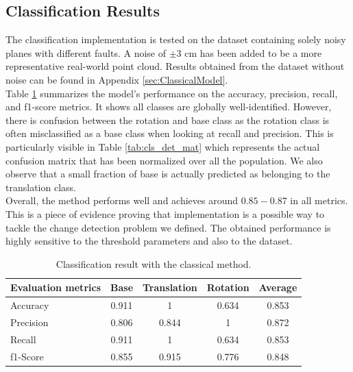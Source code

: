 \subsection{Classification Results}
The classification implementation is tested on the dataset containing solely noisy planes with different faults. A noise of $\pm 3$ cm has been added to be a more representative real-world point cloud. Results obtained from the dataset without noise can be found in Appendix \ref{sec:ClassicalModel}.\\

Table \ref{tab:cls_det_noise} summarizes the model's performance on the accuracy, precision, recall, and f1-score metrics. It shows all classes are globally well-identified. However, there is confusion between the rotation and base class as the rotation class is often misclassified as a base class when looking at recall and precision. This is particularly visible in Table \ref{tab:cls_det_mat} which represents the actual confusion matrix that has been normalized over all the population. We also observe that a small fraction of base is actually predicted as belonging to the translation class.\\

Overall, the method performs well and achieves around $0.85-0.87$ in all metrics. This is a piece of evidence proving that implementation is a possible way to tackle the change detection problem we defined. The obtained performance is highly sensitive to the threshold parameters and also to the dataset.\\

\begin{table}[H]
        \begin{center}
                \begin{tabular}{|l||c|c|c|c|}
                        \hline 
                        Evaluation metrics & Base & Translation & Rotation & Average \\
                        \hline \hline
                        Accuracy & 0.911 & 1 & 0.634 & 0.853 \\
                        \hline
                        Precision & 0.806 & 0.844 & 1 & 0.872 \\
                        \hline
                        Recall & 0.911 & 1 & 0.634 & 0.853 \\
                        \hline
                        f1-Score & 0.855 & 0.915 & 0.776 & 0.848 \\
                        \hline
                \end{tabular}
        \end{center}
        \caption{Classification result with the classical method. }
        \label{tab:cls_det_noise}
\end{table}

